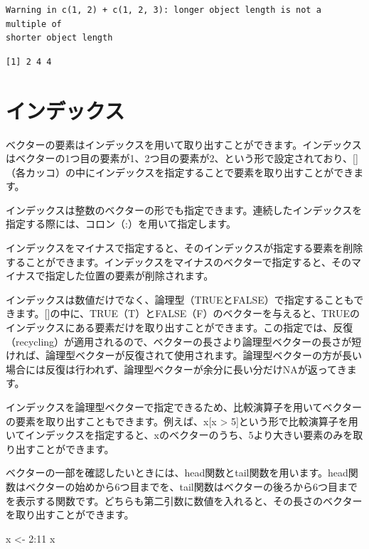 \documentclass[
  letterpaper,
  DIV=11,
  numbers=noendperiod]{scrreprt}
\newenvironment{Shaded}{\begin{snugshade}}{\end{snugshade}}
\newcommand{\DecValTok}[1]{\textcolor[rgb]{0.68,0.00,0.00}{#1}}
\newcommand{\NormalTok}[1]{\textcolor[rgb]{0.00,0.23,0.31}{#1}}
\newcommand{\OtherTok}[1]{\textcolor[rgb]{0.00,0.23,0.31}{#1}}
\newcommand{\SpecialCharTok}[1]{\textcolor[rgb]{0.37,0.37,0.37}{#1}}
\begin{document}
\begin{verbatim}
Warning in c(1, 2) + c(1, 2, 3): longer object length is not a multiple of
shorter object length
\end{verbatim}

\begin{verbatim}
[1] 2 4 4
\end{verbatim}

\hypertarget{ux30a4ux30f3ux30c7ux30c3ux30afux30b9}{%
\section{インデックス}\label{ux30a4ux30f3ux30c7ux30c3ux30afux30b9}}

ベクターの要素はインデックスを用いて取り出すことができます。インデックスはベクターの1つ目の要素が1、2つ目の要素が2、という形で設定されており、{[}{]}（各カッコ）の中にインデックスを指定することで要素を取り出すことができます。

インデックスは整数のベクターの形でも指定できます。連続したインデックスを指定する際には、コロン（:）を用いて指定します。

インデックスをマイナスで指定すると、そのインデックスが指定する要素を削除することができます。インデックスをマイナスのベクターで指定すると、そのマイナスで指定した位置の要素が削除されます。

インデックスは数値だけでなく、論理型（TRUEとFALSE）で指定することもできます。{[}{]}の中に、TRUE（T）とFALSE（F）のベクターを与えると、TRUEのインデックスにある要素だけを取り出すことができます。この指定では、反復（recycling）が適用されるので、ベクターの長さより論理型ベクターの長さが短ければ、論理型ベクターが反復されて使用されます。論理型ベクターの方が長い場合には反復は行われず、論理型ベクターが余分に長い分だけNAが返ってきます。

インデックスを論理型ベクターで指定できるため、比較演算子を用いてベクターの要素を取り出すこともできます。例えば、x{[}x
\textgreater{}
5{]}という形で比較演算子を用いてインデックスを指定すると、xのベクターのうち、5より大きい要素のみを取り出すことができます。

ベクターの一部を確認したいときには、head関数とtail関数を用います。head関数はベクターの始めから6つ目までを、tail関数はベクターの後ろから6つ目までを表示する関数です。どちらも第二引数に数値を入れると、その長さのベクターを取り出すことができます。

\begin{Shaded}
\begin{Highlighting}[]
\NormalTok{x }\OtherTok{\textless{}{-}} \DecValTok{2}\SpecialCharTok{:}\DecValTok{11}
\NormalTok{x}
\end{Highlighting}
\end{Shaded}
\end{document}
